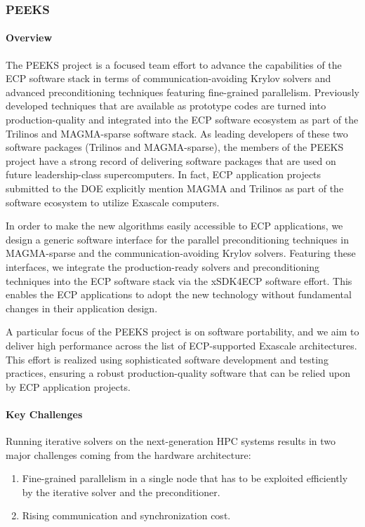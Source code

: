 \subsubsection{ PEEKS} 
\paragraph{Overview} 
The PEEKS project is a focused team effort to advance the capabilities of the 
ECP software stack in terms of communication-avoiding Krylov solvers and 
advanced preconditioning techniques featuring fine-grained parallelism.
Previously developed techniques that are available as prototype codes are 
turned into production-quality and integrated into the ECP software ecosystem 
as part of the Trilinos and MAGMA-sparse software stack.
As leading developers of these two software packages (Trilinos and 
MAGMA-sparse), the members of the PEEKS project have a strong record of 
delivering software packages that are used on future leadership-class 
supercomputers. In fact, ECP application projects submitted to the DOE explicitly mention MAGMA and Trilinos as part of the software ecosystem to utilize Exascale computers. 

In order to make the new algorithms easily accessible to ECP applications,
we design a generic software interface for the parallel preconditioning 
techniques in MAGMA-sparse and the communication-avoiding Krylov solvers. 
Featuring these interfaces, we integrate the production-ready solvers and 
preconditioning techniques into the ECP software stack via the xSDK4ECP 
software effort. This enables the ECP applications to adopt the new technology 
without fundamental changes in their application design.

A particular focus of the PEEKS project is on software portability, and we aim to 
deliver high performance across the list of ECP-supported Exascale 
architectures. This effort is realized using sophisticated software development 
and testing practices, ensuring a robust production-quality software that can 
be relied upon by ECP 
application projects.

\paragraph{Key  Challenges}
Running iterative solvers on the next-generation HPC systems results in two 
major challenges coming from the hardware architecture:
\begin{enumerate}
\item 
Fine-grained parallelism in a single node that has to be exploited efficiently 
by the iterative solver and the preconditioner.
\item
Rising communication and synchronization cost.
\end{enumerate}

